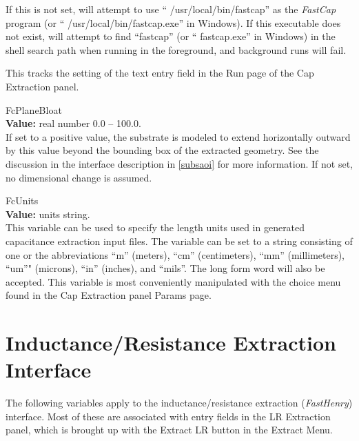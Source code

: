 \begin{description}
If this is not set, {\Xic} will attempt to use ``{\vt
/usr/local/bin/fastcap}'' as the {\it FastCap} program (or ``{\vt
/usr/local/bin/fastcap.exe}'' in Windows).  If this executable does
not exist, {\Xic} will attempt to find ``{\vt fastcap}'' (or ``{\vt
fastcap.exe}'' in Windows) in the shell search path when running in
the foreground, and background runs will fail.

This tracks the setting of the text entry field in the {\cb Run}
page of the {\cb Cap Extraction} panel.

\item{\et FcPlaneBloat}\\
{\bf Value:} real number 0.0 -- 100.0.\\
If set to a positive value, the substrate is modeled to extend
horizontally outward by this value beyond the bounding box of the
extracted geometry.  See the discussion in the interface description
in \ref{subsaoi} for more information.  If not set, no dimensional
change is assumed.

\item{\et FcUnits}\\
{\bf Value:} units string.\\
This variable can be used to specify the length units used in
generated capacitance extraction input files.  The variable can be set
to a string consisting of one or the abbreviations ``{\vt m}''
(meters), ``{\vt cm}'' (centimeters), ``{\vt mm}'' (millimeters),
``{\vt um}''" (microns), ``{\vt in}'' (inches), and ``{\vt mils}''. 
The long form word will also be accepted.  This variable is most
conveniently manipulated with the choice menu found in the {\cb Cap
Extraction} panel {\cb Params} page.
\end{description}


\section{Inductance/Resistance Extraction Interface}
\label{fhvars}
The following variables apply to the inductance/resistance extraction
({\it FastHenry}) interface.  Most of these are associated with entry
fields in the {\cb LR Extraction} panel, which is brought up with the
{\cb Extract LR} button in the {\cb Extract Menu}.

